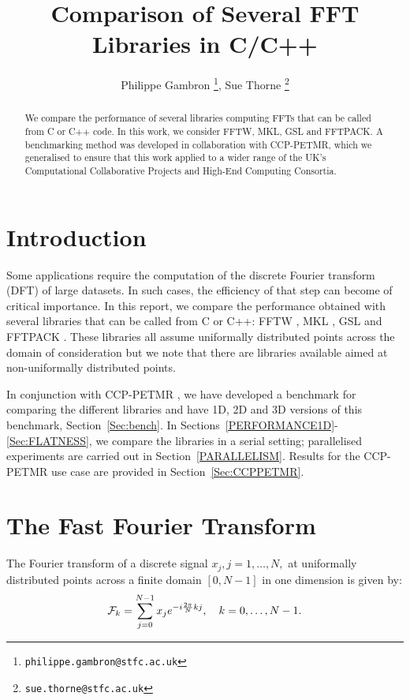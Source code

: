 \documentclass[12pt, a4paper]{article} \setlength{\textheight}{24cm}
\begin{document}
\title{Comparison of Several FFT Libraries in C/C++} \author{Philippe
  Gambron \thanks{\texttt{philippe.gambron{@}stfc.ac.uk}}, Sue Thorne
  \thanks{\texttt{sue.thorne{@}stfc.ac.uk}}} 
\maketitle
\begin{abstract}
  We compare the performance of several libraries computing FFTs that
  can be called from C or C++ code. In this work, we consider FFTW,
  MKL, GSL and FFTPACK. A benchmarking method was developed in
  collaboration with CCP-PETMR, which we generalised to ensure that
  this work applied to a wider range of the UK's Computational
  Collaborative Projects and High-End Computing Consortia.
\end{abstract}
\section{Introduction}
Some applications require the computation of the discrete Fourier
transform (DFT) of large datasets. In such cases, the efficiency of
that step can become of critical importance. In this report, we
compare the performance obtained with several libraries that can be
called from C or C++: FFTW \cite{fftw}, MKL \cite{mkl}, GSL \cite{gsl}
and FFTPACK \cite{fftpack}. These libraries all assume uniformally
distributed points across the domain of consideration but we note that
there are libraries available aimed at non-uniformally distributed
points.

In conjunction with CCP-PETMR \cite{bibccppetmr}, we have developed a
benchmark for comparing the different libraries and have 1D, 2D and 3D
versions of this benchmark, Section~\ref{Sec:bench}. In
Sections~\ref{PERFORMANCE1D}-\ref{Sec:FLATNESS}, we compare the
libraries in a serial setting; parallelised experiments are carried
out in Section~\ref{PARALLELISM}. Results for the CCP-PETMR use case
are provided in Section~\ref{Sec:CCPPETMR}.

\section{The Fast Fourier Transform}

The Fourier transform of a discrete signal $x_j, j=1,\ldots,N,$ at
uniformally distributed points across a finite domain $[0,N-1]$ in
one dimension is given by:
\begin{equation}\label{fourier} {\cal F}_k=\sum_{j=0}^{N-1} x_j
  e^{-i\frac{2\pi}{N}kj}, \quad k=0,\ldots,N-1.
\end{equation}
\end{document}
